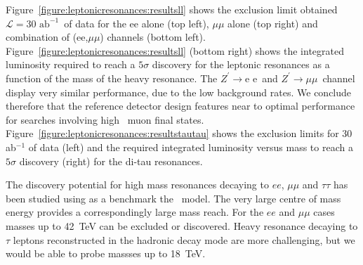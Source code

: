\documentclass{cernrep}
\newcommand*{\Zpee}{\ensuremath{Z^{\prime}\rightarrow \text{e e}}}
\newcommand*{\Zpmumu}{\ensuremath{Z^{\prime}\rightarrow \mu\mu}}
\newcommand*{\intlumifcc}{\ensuremath{\mathcal{L}=30\text{ ab}^{-1}}}
\begin{document}
Figure~\ref{figure:leptonicresonances:resultsll} shows the exclusion limit obtained \intlumifcc\ of data for the ee alone (top left), $\mu\mu$ alone (top right) and combination of (ee,$\mu\mu$) channels (bottom left). Figure~\ref{figure:leptonicresonances:resultsll} (bottom right) shows the integrated luminosity required to reach a $5\sigma$ discovery for the leptonic resonances as a function of the mass of the heavy resonance. The \Zpee\ and \Zpmumu\ channel display very similar performance, due to the low background rates. We conclude therefore that the reference detector design features near to optimal performance for searches involving high \pT\ muon final states. Figure~\ref{figure:leptonicresonances:resultstautau} shows the exclusion limits for 30 ab$^{-1}$ of data (left) and the required integrated luminosity
versus mass to reach a $5\sigma$ discovery (right) for the di-tau resonances.

The discovery potential for high mass resonances decaying to $ee$, $\mu\mu$ and $\tau\tau$ has been studied using as a benchmark the \ZpSSM\ model. The very large centre of mass energy provides a correspondingly large mass reach. For the $ee$ and $\mu\mu$ cases masses up to 42~TeV can be excluded or discovered. Heavy resonance decaying to $\tau$ leptons reconstructed in the hadronic decay mode are more challenging, but we would be able to probe massses up to 18~TeV.
\end{document}
